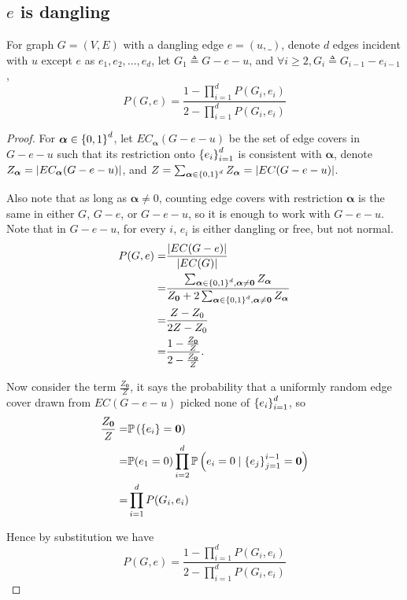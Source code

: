 \subsection{$e$ is dangling}
\begin{lemma}
For graph $G=(V,E)$ with a dangling edge $e=(u,\_)$, denote $d$
edges incident with $u$ except $e$ as $e_1, e_2, \ldots, e_d$,
let $G_1 \triangleq G - e - u$, and $\forall i \geq 2, G_i \triangleq G_{i-1} - e_{i-1}$ ,
	\begin{equation}
		P(G, e) = \frac{1-\prod_{i=1}^d P(G_i, e_i)}{2 - \prod_{i=1}^d P(G_i, e_i)} %
		\label{propp3rg}
	\end{equation}
\end{lemma}
\begin{proof}
	For $\boldsymbol\alpha \in \left\{0,1\right\}^d$, let $EC_{\boldsymbol\alpha}(G-e-u)$ be the set of edge covers in $G-e-u$ such that its restriction onto $\left\{e_i\right\}_{i=1}^{d}$ is consistent with $\boldsymbol\alpha$, denote $Z_{\boldsymbol\alpha} = \left\vert EC_{\boldsymbol\alpha}(G-e-u)\right\vert$, and $Z = \sum_{\boldsymbol\alpha \in \left\{0,1\right\}^d} Z_{\boldsymbol\alpha} = \left\vert EC(G-e-u)\right\vert$. %

		Also note that as long as $\boldsymbol\alpha \neq 0$, counting edge covers with restriction $\boldsymbol\alpha$ is the same in either $G$, $G-e$, or $G-e-u$, so it is enough to work with $G-e-u$. Note that in $G-e-u$, for every $i$, $e_i$ is either dangling or free, but not normal.
	\begin{align*}
		P(G,e) = & \frac{\left\vert EC(G-e)\right\vert}{\left\vert EC(G)\right\vert} \\
        = & \frac{\sum_{\boldsymbol\alpha \in \left\{0,1\right\}^d, \boldsymbol\alpha \neq \mathbf{0}} Z_{\boldsymbol\alpha} }{ Z_{\mathbf{0}} + 2 \sum_{\boldsymbol\alpha \in \left\{0,1\right\}^d, \boldsymbol\alpha \neq \mathbf{0}} Z_{\boldsymbol\alpha}} \\
        = &\frac{Z - Z_0}{2 Z - Z_0} \\
        = &\frac{1 - \frac{Z_{\mathbf{0}}}{Z}}{ 2 - \frac{Z_{\mathbf{0}}}{Z}}.
	\end{align*}

	Now consider the term $\frac{Z_{\mathbf{0}}}{Z}$, it says the probability that a uniformly random edge cover drawn from $EC(G-e-u)$ picked none of $\left\{e_i\right\}_{i=1}^{d}$, so
	\begin{align*}
        \frac{Z_{\mathbf{0}}}{Z} = & \mathbb{P} \left( \left\{e_i\right\} = \mathbf{0}\right) \\
        = & \mathbb{P} (e_1 = 0) \prod_{i=2}^d \mathbb{P} \left(e_i = 0 \mid \left\{e_j\right\}_{j=1}^{i-1} =\mathbf{0}\right) \\
        = &\prod_{i=1}^d P(G_i, e_i)
	\end{align*}

	Hence by substitution we have
    $$P(G, e) = \frac{1-\prod_{i=1}^d P(G_i, e_i)}{2 - \prod_{i=1}^d P(G_i, e_i)}$$
	
\end{proof}

